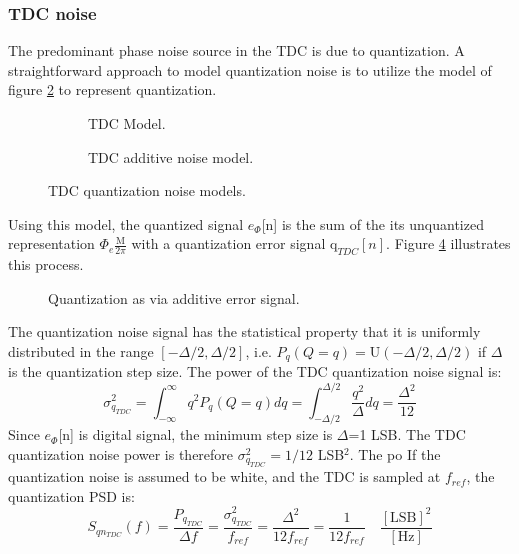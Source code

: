 \subsubsection{TDC noise}\label{tdc_noise}
	The predominant phase noise source in the TDC is due to quantization. A straightforward approach to model quantization noise is to utilize the model of figure \ref{fig:tdc_add_pn} to represent quantization.
	\begin{figure}[htb!]
	    \centering
	    \begin{subfigure}{0.5\textwidth}
	        \centering
	        
	        \caption{TDC Model.}
	        \label{fig:tdc1}
	    \end{subfigure}%
	    \begin{subfigure}{0.5\textwidth}
	        \centering
	        
	        \caption{TDC additive noise model.}
	        \label{fig:tdc_add_pn}
	    \end{subfigure}
	    \label{fig:tdc_pn_model}
	    \caption{TDC quantization noise models.}
	\end{figure}
	\FloatBarrier
	Using this model, the quantized signal $e_\Phi$[n] is the sum of the its unquantized representation $\Phi_e\frac{\mathrm{M}}{2\pi}$ with a quantization error signal $\mathrm{q}_{TDC}[n]$. Figure \ref{fig:quantization} illustrates this process.
	\begin{figure}[htb!]
		\center
		\caption{Quantization as via additive error signal.}
		\label{fig:quantization}
	\end{figure}
	\FloatBarrier
	The quantization noise signal has the statistical property that it is uniformly distributed in the range $[-\Delta/2, \Delta/2]$, i.e. $P_q(Q=q) =\mathrm{U}(-\Delta/2, \Delta/2)$ if $\Delta$ is the quantization step size. The power of the TDC quantization noise signal is:
	\begin{equation}\label{eq:tdc_noise}
		\sigma_{q_{TDC}}^2 = \int_{-\infty}^\infty q^2P_q(Q=q)dq =  \int_{-\Delta/2}^{\Delta/2}\frac{q^2}{\Delta}dq = \frac{\Delta^2}{12}
	\end{equation}
	Since $e_\Phi$[n] is digital signal, the minimum step size is $\Delta$=1 LSB. The TDC quantization noise power is therefore $\sigma_{q_{TDC}}^2 = 1/12$ LSB$^2$. The po
	If the quantization noise is assumed to be white, and the TDC is sampled at $f_{ref}$, the quantization PSD is:
	\begin{equation}
		S_{qn_{TDC}}(f) = \frac{P_{q_{TDC}}}{\Delta f} = \frac{\sigma_{q_{TDC}}^2}{f_{ref}} = \frac{\Delta^2}{12f_{ref}} = \frac{1}{12f_{ref}} \hspace{1em}\frac{[\text{LSB}]^2}{[\text{Hz}]}
	\end{equation}

